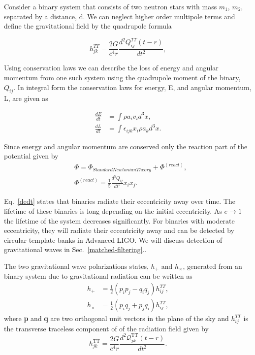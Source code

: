 Consider a binary system that consists of two neutron stars with mass $m_1$, $m_2$, separated by a distance, d. We can neglect higher order multipole terms and define the gravitational field by the quadrupole formula~\cite{misner:1973} 

\begin{equation}
    h^{TT}_{jk} = \frac{2G}{c^4r}\frac{d^2Q^{TT}_{ij}(t-r)}{dt^2},
\end{equation}

Using conservation laws we can describe the loss of energy and angular momentum from one such system using the quadrupole moment of the binary, $Q_{ij}$. In integral form the conservation laws for energy, E, and angular momentum, L, are given as~\cite{Peters:1964zz, misner:1973}

\begin{equation}
    \begin{split}
        \frac{dE}{dt} &= \int \rho a_i v_i d^3x, \\
        \frac{dL}{dt} &= \int \epsilon_{ijk}x_i\rho a_k d^3x.
    \end{split}
\end{equation}

Since energy and angular momentum are conserved only the reaction part of the potential given by~\cite{misner:1973}
\begin{equation}
    \begin{split}
        &\Phi = \Phi_{Standard Newtonian Theory} + \Phi^{(react)}, \\
        &\Phi^{(react)} = \frac{1}{5}\frac{d^5Q_{ij}}{dt^5}x_ix_j.
    \end{split}
\end{equation}

Eq.~\ref{dedt} states that binaries radiate their eccentricity away over time. The lifetime of these binaries is long depending on the initial eccentricity. As $e \to 1$ the lifetime of the system decreases significantly. For binaries with moderate eccentricity, they will radiate their eccentricity away and can be detected by circular template banks in Advanced LIGO. We will discuss detection of gravitational waves in Sec.~\ref{matched-filtering}..

The two gravitational wave polarizations states, $h_+$ and $h_\times$, generated from an binary system due to gravitational radiation can be written as~\cite{Damour:2004bz}
\begin{equation}\label{polarizations}
\begin{aligned}
h_{+} &=\frac{1}{2}\left(p_{i} p_{j}-q_{i} q_{j}\right) h_{i j}^{T T}, \\
h_{\times} &=\frac{1}{2}\left(p_{i} q_{j}+p_{j} q_{i}\right) h_{i j}^{T T},
\end{aligned}
\end{equation}
where \textbf{p} and \textbf{q} are two orthogonal unit vectors in the plane of the sky and $h_{i j}^{TT}$ is the transverse traceless component of of the radiation field given by
\begin{equation}
h_{j k}^{\mathrm{TT}}=\frac{2 G}{c^{4} r} \frac{d^{2} \mathcal{Q}_{j k}^{\mathrm{TT}}(t-r)}{d t^{2}}.
\end{equation}

